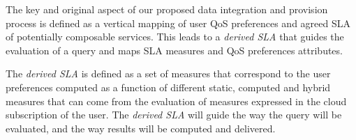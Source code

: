 
The key and original aspect of  our proposed data integration and provision process is  defined as a vertical mapping of user QoS preferences and agreed SLA of potentially composable services. 
This  leads to a {\em derived SLA} that guides the evaluation of a query and maps SLA measures and QoS preferences attributes.  




The {\em derived SLA} is defined as a set of measures that correspond to the user preferences computed as a function of different static, computed and hybrid measures that can come from the evaluation of measures expressed in the cloud subscription of the user. 
The {\em derived SLA}  will guide the way the query will be evaluated, and the way results will be computed and delivered.

